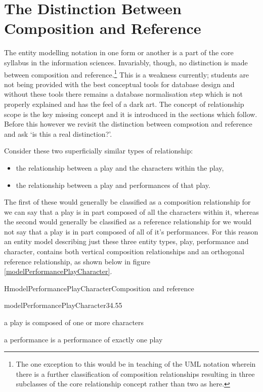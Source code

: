 
\section{The Distinction Between Composition and Reference}
\label{DistinctionBetweenCompositionAndReference}

The entity modelling notation in one form or another is a part of the core syllabus in the information sciences. Invariably, though, no distinction is made between composition and reference.\footnote{
The one exception to this would be in teaching of the UML notation wherein there is a further classification of composition relationships resulting in three subclasses of the core relationship concept rather than two as here.} This is a weakness currently; students are not being provided with the best conceptual tools for database design and without these tools there remains a database normalisation step which is not properly explained and has the feel of a dark art. The concept of relationship scope is the key missing concept and it is introduced in the sections which follow. Before this however we revisit the distinction between compsotion and reference and ask ‘is this a real distinction?’.

Consider these two superficially similar types of relationship:
\begin{itemize}
\item the relationship between a play and the characters within the play,
\item the relationship between a play and performances of that play.
\end{itemize}
The first of these would generally be classified as a composition relationship for we can say that a play is in part composed of all the characters within it, whereas the second would generally be classified as a reference relationship for we would not say that a play is in part composed of all of it's performances. For this reason an entity model describing just these three entity types, play, performance and character, contains both vertical composition relationships and an orthogonal reference relationship, as shown below in figure \ref{modelPerformancePlayCharacter}.

\begin{erboxedFigure}{H}{modelPerformancePlayCharacter}{Composition and reference}
\begin{erbulletedModel}{modelPerformancePlayCharacter}{3}{4.5}{5}
\item a play is composed of one or more characters
\item a performance is a performance of exactly one play
\end{erbulletedModel}
\end{erboxedFigure}

